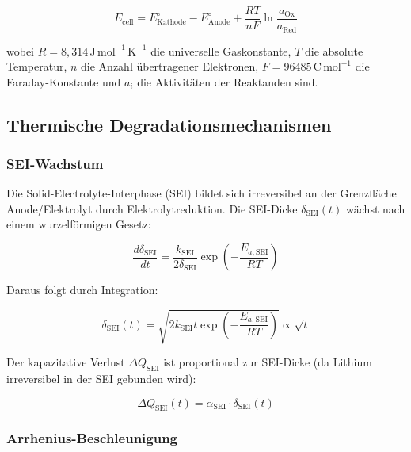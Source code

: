 ﻿\documentclass[12pt,a4paper]{article}
\begin{document}
	\begin{equation}
		E_\mathrm{cell} = E^\circ_\mathrm{Kathode} - E^\circ_\mathrm{Anode}
		+ \frac{RT}{nF}\ln\frac{a_\mathrm{Ox}}{a_\mathrm{Red}}
		\label{eq:nernst}
	\end{equation}
	
	wobei $R = 8{,}314\,\mathrm{J\,mol^{-1}\,K^{-1}}$ die universelle Gaskonstante,
	$T$ die absolute Temperatur, $n$ die Anzahl übertragener Elektronen, $F =
	96485\,\mathrm{C\,mol^{-1}}$ die Faraday-Konstante und $a_i$ die Aktivitäten
	der Reaktanden sind.
	
	\subsection{Thermische Degradationsmechanismen}
	\label{subsec:therm_deg}
	
	\subsubsection{SEI-Wachstum}
	
	Die Solid-Electrolyte-Interphase (SEI) bildet sich irreversibel an der
	Grenzfläche Anode/Elektrolyt durch Elektrolytreduktion. Die SEI-Dicke
	$\delta_\mathrm{SEI}(t)$ wächst nach einem wurzelförmigen Gesetz:
	
	\begin{equation}
		\frac{d\delta_\mathrm{SEI}}{dt} = \frac{k_\mathrm{SEI}}{2\delta_\mathrm{SEI}}
		\exp\!\left(-\frac{E_{a,\mathrm{SEI}}}{RT}\right)
		\label{eq:sei_growth}
	\end{equation}
	
	Daraus folgt durch Integration:
	
	\begin{equation}
		\delta_\mathrm{SEI}(t) = \sqrt{2 k_\mathrm{SEI} t \exp\!\left(-\frac{E_{a,\mathrm{SEI}}}{RT}\right)}
		\propto \sqrt{t}
		\label{eq:sei_sqrt}
	\end{equation}
	
	Der kapazitative Verlust $\Delta Q_\mathrm{SEI}$ ist proportional zur SEI-Dicke
	(da Lithium irreversibel in der SEI gebunden wird):
	
	\begin{equation}
		\Delta Q_\mathrm{SEI}(t) = \alpha_\mathrm{SEI} \cdot \delta_\mathrm{SEI}(t)
		\label{eq:cap_loss_sei}
	\end{equation}
	
	\subsubsection{Arrhenius-Beschleunigung}
	
\end{document}
